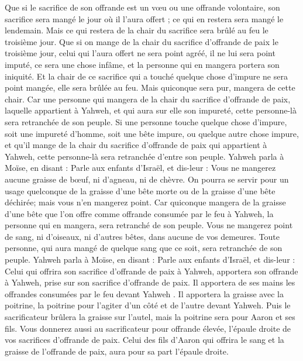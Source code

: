 \begin{multicols}{2}
Que si le sacrifice de son offrande est un vœu ou une offrande volontaire, son sacrifice sera mangé le jour où il l'aura offert ; ce qui en restera sera mangé le lendemain.
Mais ce qui restera de la chair du sacrifice sera brûlé au feu le troisième jour.
Que si on mange de la chair du sacrifice d'offrande de paix le troisième jour, celui qui l'aura offert ne sera point agréé, il ne lui sera point imputé, ce sera une chose infâme, et la personne qui en mangera portera son iniquité.
Et la chair de ce sacrifice qui a touché quelque chose d'impure ne sera point mangée, elle sera brûlée au feu. Mais quiconque sera pur, mangera de cette chair.
Car une personne qui mangera de la chair du sacrifice d'offrande de paix, laquelle appartient à Yahweh, et qui aura sur elle son impureté, cette personne-là sera retranchée de son peuple.
Si une personne touche quelque chose d'impure, soit une impureté d'homme, soit une bête impure, ou quelque autre chose impure, et qu'il mange de la chair du sacrifice d'offrande de paix qui appartient à Yahweh, cette personne-là sera retranchée d'entre son peuple.
Yahweh parla à Moïse, en disant :
Parle aux enfants d'Israël, et dis-leur : Vous ne mangerez aucune graisse de bœuf, ni d'agneau, ni de chèvre.
On pourra se servir pour un usage quelconque de la graisse d'une bête morte ou de la graisse d'une bête déchirée; mais vous n'en mangerez point.
Car quiconque mangera de la graisse d'une bête que l'on offre comme offrande consumée par le feu à Yahweh, la personne qui en mangera, sera retranché de son peuple.
Vous ne mangerez point de sang, ni d'oiseaux, ni d'autres bêtes, dans aucune de vos demeures.
Toute personne, qui aura mangé de quelque sang que ce soit, sera retranchée de son peuple.
Yahweh parla à Moïse, en disant :
Parle aux enfants d'Israël, et dis-leur : Celui qui offrira son sacrifice d'offrande de paix à Yahweh, apportera son offrande à Yahweh, prise sur son sacrifice d'offrande de paix.
Il apportera de ses mains les offrandes consumées par le feu devant Yahweh . Il apportera la graisse avec la poitrine, la poitrine pour l'agiter d'un côté et de l'autre devant Yahweh.
Puis le sacrificateur brûlera la graisse sur l'autel, mais la poitrine sera pour Aaron et ses fils.
Vous donnerez aussi au sacrificateur pour offrande élevée, l'épaule droite de vos sacrifices d'offrande de paix.
Celui des fils d'Aaron qui offrira le sang et la graisse de l'offrande de paix, aura pour sa part l'épaule droite.

\end{multicols}
